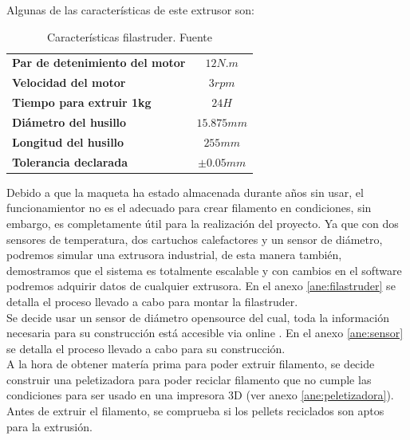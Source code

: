 Algunas de las características de este extrusor son:

\begin{table}[H]
    \centering

        \begin{tabular}{lc}
        \textbf{Par de detenimiento del motor}            & $12N.m$                           \\
        \textbf{Velocidad del motor}                      & $3 rpm$                           \\
        \textbf{Tiempo para extruir 1kg}                  & $24H$                             \\
        \textbf{Diámetro del husillo}                     & $15.875mm$                        \\
        \textbf{Longitud del husillo}                     & $255mm$                           \\
        \textbf{Tolerancia declarada}                     & $\pm 0.05 mm$                     \\    

    \end{tabular}
    \caption[Características filastruder.]{Características filastruder. Fuente\cite{tfg_diego}}
    \label{tab:caract_filas}
\end{table}

Debido a que la maqueta ha estado almacenada durante años sin usar, el funcionamientor no es el adecuado para crear filamento en condiciones, sin embargo, es completamente útil para la realización del proyecto. Ya que con dos sensores de temperatura, dos cartuchos calefactores y un sensor de diámetro, podremos simular una extrusora industrial, de esta manera también, demostramos que el sistema es totalmente escalable y con cambios en el software podremos adquirir datos de cualquier extrusora. En el anexo \ref{ane:filastruder} se detalla el proceso llevado a cabo para montar la filastruder. \\

Se decide usar un sensor de diámetro opensource del cual, toda la información necesaria para su construcción está accesible via online \cite{thing_filamento}. En el anexo \ref{ane:sensor} se detalla el proceso llevado a cabo para su construcción.\\

A la hora de obtener matería prima para poder extruir filamento, se decide construir una peletizadora para poder reciclar filamento que no cumple las condiciones para ser usado en una impresora 3D (ver anexo \ref{ane:peletizadora}). Antes de extruir el filamento, se comprueba si los pellets reciclados son aptos para la extrusión.\\

